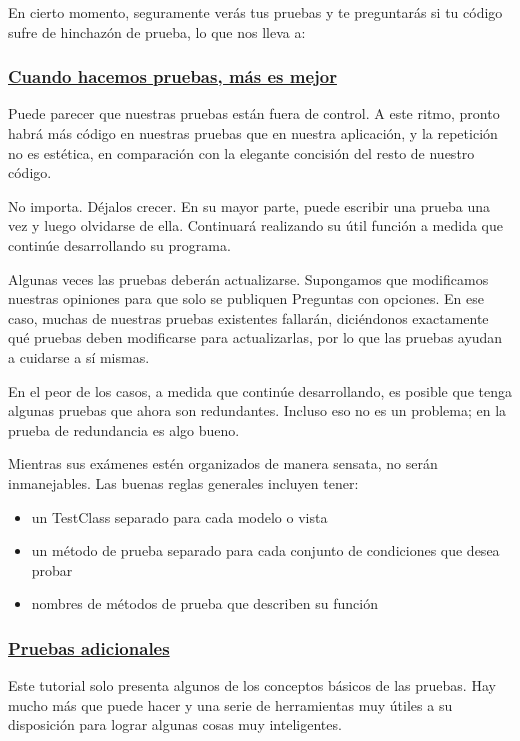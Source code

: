 \documentclass[10pt]{article}
\begin{document}
En cierto momento, seguramente verás tus pruebas y te preguntarás si tu código sufre de hinchazón de prueba, lo que nos lleva a:

\subsubsection*{\underline{Cuando hacemos pruebas, más es mejor}}
Puede parecer que nuestras pruebas están fuera de control. A este ritmo, pronto habrá más código en nuestras pruebas que en nuestra aplicación, y la repetición no es estética, en comparación con la elegante concisión del resto de nuestro código.

No importa. Déjalos crecer. En su mayor parte, puede escribir una prueba una vez y luego olvidarse de ella. Continuará realizando su útil función a medida que continúe desarrollando su programa.

Algunas veces las pruebas deberán actualizarse. Supongamos que modificamos nuestras opiniones para que solo se publiquen Preguntas con opciones. En ese caso, muchas de nuestras pruebas existentes fallarán, diciéndonos exactamente qué pruebas deben modificarse para actualizarlas, por lo que las pruebas ayudan a cuidarse a sí mismas.

En el peor de los casos, a medida que continúe desarrollando, es posible que tenga algunas pruebas que ahora son redundantes. Incluso eso no es un problema; en la prueba de redundancia es algo bueno.

Mientras sus exámenes estén organizados de manera sensata, no serán inmanejables. Las buenas reglas generales incluyen tener:
\begin{itemize}
\item 
un TestClass separado para cada modelo o vista

\item un método de prueba separado para cada conjunto de condiciones que desea probar


\item nombres de métodos de prueba que describen su función 
\end{itemize}

\subsubsection*{\underline{Pruebas adicionales}}
Este tutorial solo presenta algunos de los conceptos básicos de las pruebas. Hay mucho más que puede hacer y una serie de herramientas muy útiles a su disposición para lograr algunas cosas muy inteligentes.
\end{document}
